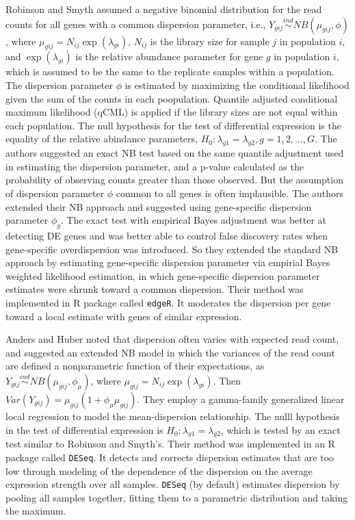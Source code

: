 Robinson and Smyth \citep{robinson2007moderated} assumed a negative binomial distribution for the read counts for all genes with a common dispersion parameter, i.e., $Y_{gij} \stackrel{ind}{\sim} NB(\mu_{gij},\phi)$, where $\mu_{gij}=N_{ij}\exp(\lambda_{gi})$, $N_{ij}$ is the library size for sample $j$ in population $i$, and $\exp(\lambda_{gi})$ is the relative abundance parameter for gene $g$ in population $i$, which is assumed to be the same to the replicate samples within a population. The dispersion parameter $\phi$ is estimated by maximizing the conditional likelihood given the sum of the counts in each poopulation. Quantile adjusted conditional maximum likelihood (qCML) is applied if the library sizes are not equal within each population. The null hypothesis for the test of differential expression is the equality of the relative abindance parameters, $H_0: \lambda_{g1} = \lambda_{g2}, g=1,2,...,G$. The authors suggested an exact NB test based on the same quantile adjustment used in estimating the dispersion parameter, and a p-value calculated as the probability of observing counts greater than those observed\citep{lorenz2014using}. But the assumption of dispersion parameter $\phi$ common to all genes is often implausible. The authors extended their NB approach and suggested using gene-specific dispersion parameter $\phi_g$\citep{robinson2007small}. The exact test with empirical Bayes adjustment was better at detecting DE genes and was better able to control false discovery rates when gene-specific overdispersion was introduced\citep{lorenz2014using}. So they extended the standard NB approach by estimating gene-specific dispersion parameter via empirial Bayes weighted likelihood estimation, in which gene-specific dispersion parameter estimates were shrunk toward a common dispersion. Their method was implemented in R package called {\tt edgeR}. It moderates the dispersion per gene toward a local estimate with genes of similar expression. 


Anders and Huber \citep{anders2010differential} noted that dispersion often varies with expected read count, and suggested an extended NB model in which the variances of the read count are defined a nonparametric function of their expectations, as $Y_{gij} \stackrel{ind}{\sim} NB(\mu_{gij}, \phi_\mu)$, where $\mu_{gij}=N_{ij}\exp(\lambda_{gi})$. Then $Var(Y_{gij}) = \mu_{gij}(1+\phi_\mu \mu_{gij})$. They employ a gamma-family generalized linear local regression to model the mean-dispersion relationship. The nulll hypothesis in the test of differential expression is $H_0: \lambda_{g1} = \lambda_{g2}$, which is tested by an exact test similar to Robinson and Smyth's. Their method was implemented in an R package called {\tt DESeq}. It detects and corrects dispersion estimates that are too low through modeling of the dependence of the dispersion on the average expression strength over all samples. {\tt DESeq} (by default) estimates dispersion by pooling all samples together, fitting them to a parametric distribution and taking the maximum.

